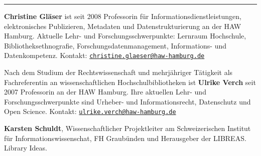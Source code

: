 \begin{center}\rule{0.5\linewidth}{0.5pt}\end{center}

\textbf{Christine Gläser} ist seit 2008 Professorin für
Informationsdienstleistungen, elektronisches Publizieren, Metadaten und
Datenstrukturierung an der HAW Hamburg. Aktuelle Lehr- und
Forschungsschwerpunkte: Lernraum Hochschule, Bibliotheksethnografie,
Forschungsdatenmanagement, Informations- und Datenkompetenz. Kontakt:
\href{mailto:christine.glaeser@haw-hamburg.de}{\nolinkurl{christine.glaeser@haw-hamburg.de}}

Nach dem Studium der Rechtswissenschaft und mehrjähriger Tätigkeit als
Fachreferentin an wissenschaftlichen Hochschulbibliotheken ist
\textbf{Ulrike Verch} seit 2007 Professorin an der HAW Hamburg. Ihre
aktuellen Lehr- und Forschungsschwerpunkte sind Urheber- und
Informationsrecht, Datenschutz und Open Science. Kontakt:
\href{mailto:ulrike.verch@haw-hamburg.de}{\nolinkurl{ulrike.verch@haw-hamburg.de}}

\textbf{Karsten Schuldt}, Wissenschaftlicher Projektleiter am
Schweizerischen Institut für Informationswissenschat, FH Graubünden und
Herausgeber der LIBREAS. Library Ideas.

